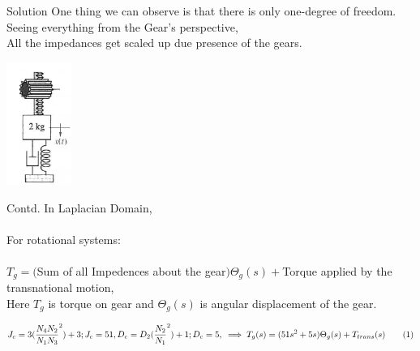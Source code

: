 \documentclass{beamer}
\numberwithin{equation}{section}
\begin{document}
\begin{frame}{Solution}
    One thing we can observe is that there is only one-degree of freedom.\\
    Seeing everything from the Gear's perspective,\\
    All the impedances get scaled up due presence of the gears.\\
    \begin{center}
     \includegraphics[height = 4cm]{./figs/gear.png}    
    \end{center}
\end{frame}

\begin{frame}{Contd.}
In Laplacian Domain,\\\\
For rotational systems:\\\\
        $T_g = ($Sum of all Impedences about the gear$){\Theta_{g}(s)} + $Torque applied by the transnational motion,\\
Here $T_g$ is torque on gear and $\Theta_g(s)$ is angular displacement of the gear.
    \begin{center}
        \begin{equation*}
            J_e = 3({\frac{N_4N_2}{N_1N_3}}^2) + 3;J_e = 51,\\
            D_e = D_2({\frac{N_2}{N_1}}^2) + 1;D_e = 5,\\
            \implies T_g(s) = (51s^2 + 5s){\Theta_g(s)} + T_{trans}(s) \tag{1} \label{eq:main_eq}
        \end{equation*}
    \end{center}
\end{frame}
\end{document}
